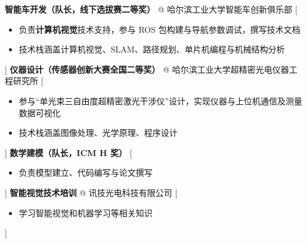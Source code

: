 \documentclass[zh]{resume}
\begin{document}
\begin{experiences}
    {\textbf{智能车开发（队长，线下选拔赛二等奖）} @ 哈尔滨工业大学智能车创新俱乐部}%
    [\begin{itemize}
      \item 负责\textbf{计算机视觉}技术支持，参与 ROS 包构建与导航参数调试，撰写技术文档
      \item 技术栈涵盖计算机视觉、SLAM、路径规划、单片机编程与机械结构分析
    \end{itemize}]
  \separator{0.5ex}
    {\textbf{仪器设计（传感器创新大赛全国二等奖）} @ 哈尔滨工业大学超精密光电仪器工程研究所}%
    [\begin{itemize}
      \item 参与\enquote{单光束三自由度超精密激光干涉仪}设计，实现仪器与上位机通信及测量数据可视化
      \item 技术栈涵盖图像处理、光学原理、程序设计
    \end{itemize}]
  \separator{0.5ex}
    {\textbf{数学建模（队长，ICM H 奖）}}%
    [\begin{itemize}
      \item 负责模型建立、代码编写与论文撰写
    \end{itemize}]
  \separator{0.5ex}
    {\textbf{智能视觉技术培训} @ 讯技光电科技有限公司}%
    [\begin{itemize}
      \item 学习智能视觉和机器学习等相关知识
    \end{itemize}]
\end{experiences}
\clearpage

\begin{experiences}
\end{experiences}
\end{document}
